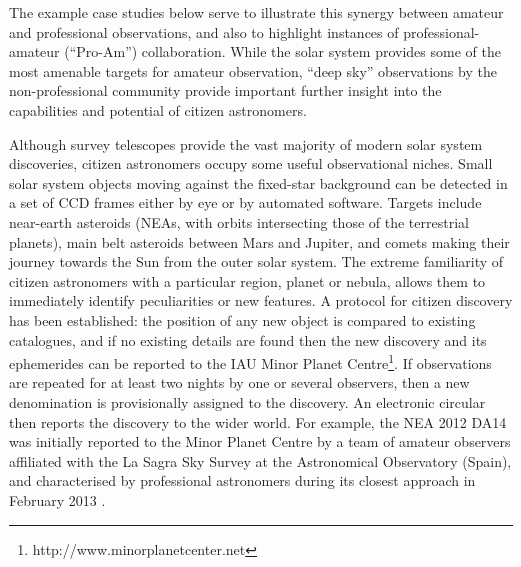 \documentclass{ar2e}
\begin{document}
The example case studies below serve to illustrate this synergy between amateur
and professional observations, and also to highlight instances of
professional-amateur (``Pro-Am'') collaboration. While the solar system provides
some of the most amenable targets for amateur observation, ``deep sky''
observations by the non-professional community provide important further insight
into the capabilities and potential of citizen astronomers.



Although survey telescopes provide the vast majority of modern solar system
discoveries, citizen astronomers occupy some useful observational niches.  Small
solar system objects moving against the fixed-star background can be detected in
a set of CCD frames either by eye or by automated software. Targets include
near-earth asteroids (NEAs, with orbits intersecting those of the terrestrial
planets), main belt asteroids between Mars and Jupiter, and comets making their
journey towards the Sun from the outer solar system. The extreme familiarity of
citizen astronomers with a particular region, planet or nebula, allows them to
immediately identify peculiarities or new features.  A protocol for citizen
discovery has been established: the position of any new object is compared to
existing catalogues, and if no existing details are found then the new discovery
and its ephemerides can be reported to the IAU Minor Planet
Centre\footnote{http://www.minorplanetcenter.net}.   If observations are
repeated for at least two nights by one or several observers, then a new
denomination is provisionally assigned to the discovery.   An electronic
circular then reports the discovery to the wider world.  For example, the NEA
2012 DA14 was initially reported to the Minor Planet Centre by a team of amateur
observers affiliated with the La Sagra Sky Survey at the Astronomical
Observatory (Spain), and characterised by professional astronomers during its
closest approach in February 2013 \citep[e.g., ][]{13deleon}.
\end{document}
